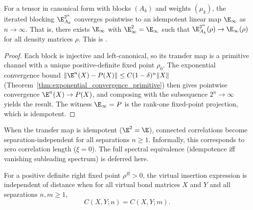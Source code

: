 \begin{theorem}%
    \label{thm:rg_flow_converges_of_cf}
    \leanok
    For a tensor in canonical form with blocks $(A_k)$ and weights $(\mu_k)$,
    the iterated blocking $\E_{A_k}^{2^n}$ converges pointwise to an
    idempotent linear map $\E_\infty$ as $n\to\infty$.
    That is, there exists $\E_\infty$ with $\E_\infty^2 = \E_\infty$ such that
    $\E_{A_k}^{2^n}(\rho) \to \E_\infty(\rho)$ for all density matrices $\rho$.
    This is \cite[Appendix~B]{Cirac2016MPDO_arXiv}.
\end{theorem}
\begin{proof}\leanok
    Each block is injective and left-canonical, so its transfer map is a
    primitive channel with a unique positive-definite fixed point $\rho_0$.
    The exponential convergence bound
    $\lVert \E^n(X) - P(X)\rVert \le C(1-\delta)^n \lVert X\rVert$
    (Theorem~\ref{thm:exponential_convergence_primitive}) then gives
    pointwise convergence $\E^n(X)\to P(X)$, and composing with the
    subsequence $2^n\to\infty$ yields the result.
    The witness $\E_\infty = P$ is the rank-one fixed-point projection,
    which is idempotent.
\end{proof}

\begin{remark}\label{rem:zero_correlation_length}
    When the transfer map is idempotent ($\E^2=\E$), connected correlations become
    separation-independent for all separations $n \ge 1$.
    Informally, this corresponds to zero correlation length ($\xi=0$).
    The full spectral equivalence (idempotence iff vanishing subleading spectrum)
    is deferred here.
\end{remark}

\begin{definition}\label{def:is_cid}
    \leanok
    For a positive definite right fixed point $\rho^R > 0$, the virtual
    insertion expression is independent of distance when for all virtual bond
    matrices $X$ and $Y$ and all separations $n,m \ge 1$,
    \[
        C(X,Y;n) = C(X,Y;m).
    \]
\end{definition}

